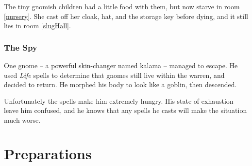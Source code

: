 \begin{multicols}{2}
\begin{exampletext}
  The tiny gnomish children had a little food with them, but now starve in room \ref{nursery}.
  She cast off her cloak, hat, and the storage key before dying, and it still lies in room \ref{slugHall}.
\end{exampletext}

\subsubsection{The Spy}
\label{kalama}

\begin{exampletext}
  One gnome -- a powerful skin-changer named \gls{kalama} -- managed to escape.
  He used \textit{Life} spells to determine that gnomes still live within the \gls{warren}, and decided to return.
  He morphed his body to look like a goblin, then descended.

  Unfortunately the spells make him extremely hungry.
  His state of exhaustion leave him confused, and he knows that any spells he casts will make the situation much worse.
\end{exampletext}

\end{multicols}

\section{Preparations}

